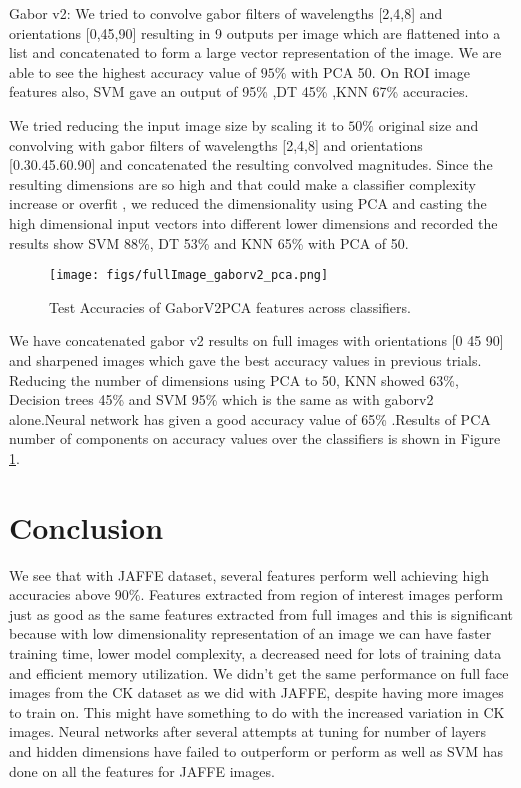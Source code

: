\documentclass[10pt,twocolumn,letterpaper]{article}
\begin{document}
Gabor v2: We tried to convolve gabor filters of wavelengths [2,4,8] and orientations [0,45,90] resulting in 9 outputs per image which are flattened into a list and concatenated to form a large vector representation of the image. We are able to see the highest accuracy value of $95\%$ with PCA 50.
On ROI image features also, SVM gave an output of 95\% ,DT 45\% ,KNN 67\% accuracies.  

\par
We tried reducing the input image size by scaling it to $50\%$ original size and convolving with gabor filters of wavelengths [2,4,8] and orientations [0.30.45.60.90] and concatenated the resulting convolved magnitudes. Since the resulting dimensions are so high and that could make a classifier complexity increase or overfit , we reduced the dimensionality using PCA and casting the high dimensional input vectors into different lower dimensions and recorded the results show SVM 88\%, DT 53\% and KNN 65\% with PCA of 50.

\begin{figure}[h]
\centerline{\texttt{[image: figs/fullImage\_gaborv2\_pca.png]}}
\caption{Test Accuracies of GaborV2PCA features across classifiers.}
\label{fig:testacc5}
\end{figure}

We have concatenated gabor v2 results on full images with orientations [0 45 90] and sharpened images which gave the best accuracy values in previous trials. Reducing the number of dimensions using PCA to 50, KNN showed 63\%, Decision trees 45\% and SVM 95\% which is the same as with gaborv2 alone.Neural network has given a good accuracy value of 65\% .Results of PCA number of components on accuracy values over the classifiers is shown in Figure \ref{fig:testacc5}.

\section{Conclusion}
We see that with JAFFE dataset, several features perform well achieving high accuracies above 90\%. Features extracted from region of interest images perform just as good as the same features extracted from full images and this is significant because with low dimensionality representation of an image we can have faster training time, lower model complexity, a decreased need for lots of training data and efficient memory utilization. We didn't get the same performance on full face images from the CK dataset as we did with JAFFE, despite having more images to train on. This might have something to do with the increased variation in CK images. Neural networks after several attempts at tuning for number of layers and hidden dimensions have failed to outperform or perform as well as SVM has done on all the features for JAFFE images. \\
\end{document}
